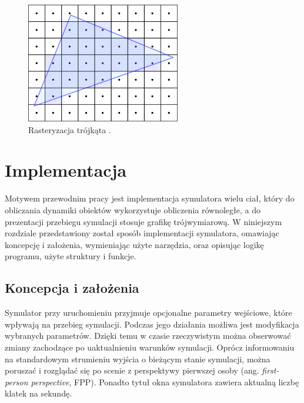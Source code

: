 \documentclass[12pt, twoside, openany]{report}
\begin{document}


\begin{figure}[H]
\centering
\includegraphics[width=0.6\textwidth,height=\textheight,keepaspectratio]{rasteryzacja.png}
\caption{Rasteryzacja trójkąta \cite{bib:rasteryzacja}.}
\label{fig:rasteryzacja}
\end{figure}

\chapter{Implementacja}

Motywem przewodnim pracy jest implementacja symulatora wielu ciał, który do obliczania dynamiki obiektów wykorzystuje obliczenia równoległe, a do prezentacji przebiegu symulacji stosuje grafikę trójwymiarową. W niniejszym rozdziale przedstawiony został sposób implementacji symulatora, omawiając koncepcję i założenia, wymieniając użyte narzędzia, oraz opisując logikę programu, użyte struktury i funkcje.


\section{Koncepcja i założenia}


Symulator przy uruchomieniu przyjmuje opcjonalne parametry wejściowe, które wpływają na przebieg symulacji. Podczas jego działania możliwa jest modyfikacja wybranych parametrów. Dzięki temu w czasie rzeczywistym można obserwować zmiany zachodzące po uaktualnieniu warunków symulacji. Oprócz informowaniu na standardowym strumieniu wyjścia o bieżącym stanie symulacji, można poruszać i rozglądać się po scenie z perspektywy pierwszej osoby (ang. \textit{first-person perspective}, FPP). Ponadto tytuł okna symulatora zawiera aktualną liczbę klatek na sekundę.
\end{document}
